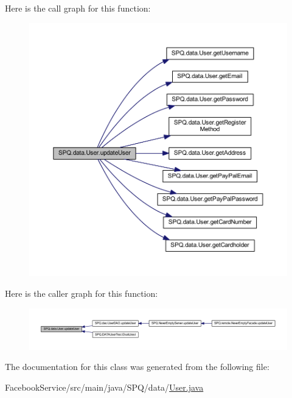 Here is the call graph for this function\+:\nopagebreak
\begin{figure}[H]
\begin{center}
\leavevmode
\includegraphics[width=350pt]{class_s_p_q_1_1data_1_1_user_ac472400b9deed770cf6f3591dc9e2886_cgraph}
\end{center}
\end{figure}
Here is the caller graph for this function\+:\nopagebreak
\begin{figure}[H]
\begin{center}
\leavevmode
\includegraphics[width=350pt]{class_s_p_q_1_1data_1_1_user_ac472400b9deed770cf6f3591dc9e2886_icgraph}
\end{center}
\end{figure}


The documentation for this class was generated from the following file\+:\begin{DoxyCompactItemize}
\item 
Facebook\+Service/src/main/java/\+S\+P\+Q/data/\mbox{\hyperlink{_facebook_service_2src_2main_2java_2_s_p_q_2data_2_user_8java}{User.\+java}}\end{DoxyCompactItemize}
